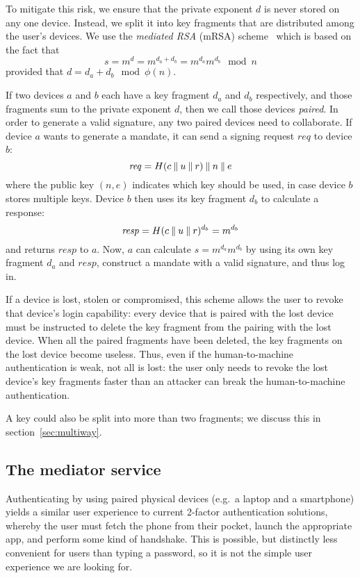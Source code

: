 To mitigate this risk, we ensure that the private exponent $d$ is never stored on any one device.
Instead, we split it into key fragments that are distributed among the user's devices. We use the
\emph{mediated RSA} (mRSA) scheme~\cite{Boneh01, Kutyiowski12} which is based on the fact that
$$s = m^d = m^{d_a + d_b} = m^{d_a} m^{d_b} \mod n$$ provided that $d = d_a + d_b \mod \phi(n)$.

If two devices $a$ and $b$ each have a key fragment $d_a$ and $d_b$ respectively, and those
fragments sum to the private exponent $d$, then we call those devices \emph{paired}. In order to
generate a valid signature, any two paired devices need to collaborate. If device $a$ wants to
generate a mandate, it can send a signing request $\mathit{req}$ to device $b$:
$$\mathit{req} = H(c \mathbin{\|} u \mathbin{\|} r) \mathbin{\|} n \mathbin{\|} e$$
where the public key $(n, e)$ indicates which key should be used, in case device $b$ stores multiple
keys. Device $b$ then uses its key fragment $d_b$ to calculate a response:
$$\mathit{resp} = H(c \mathbin{\|} u \mathbin{\|} r)^{d_b} = m^{d_b}$$
and returns $\mathit{resp}$ to $a$. Now, $a$ can calculate $s = m^{d_a} m^{d_b}$ by using its own
key fragment $d_a$ and $\mathit{resp}$, construct a mandate with a valid signature, and thus log in.

If a device is lost, stolen or compromised, this scheme allows the user to revoke that device's
login capability: every device that is paired with the lost device must be instructed to delete the
key fragment from the pairing with the lost device. When all the paired fragments have been deleted,
the key fragments on the lost device become useless. Thus, even if the human-to-machine
authentication is weak, not all is lost: the user only needs to revoke the lost device's key
fragments faster than an attacker can break the human-to-machine authentication.

A key could also be split into more than two fragments; we discuss this in section~\ref{sec:multiway}.

\subsection{The mediator service}\label{sec:mediator}

Authenticating by using paired physical devices (e.g.\ a laptop and a smartphone) yields a similar
user experience to current 2-factor authentication solutions, whereby the user must fetch the phone
from their pocket, launch the appropriate app, and perform some kind of handshake. This is
possible, but distinctly less convenient for users than typing a password, so it is not the simple
user experience we are looking for.

